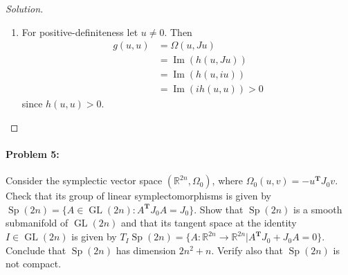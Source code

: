 \begin{proof}[Solution]
\begin{enumerate}
		\item For positive-definiteness let $u\neq 0$. Then
			\begin{align*}
				g(u,u)&=\Omega(u,Ju)\\
				&=\operatorname{Im}(h(u,Ju))\\
				&=\operatorname{Im}(h(u,iu))\\
				&=\operatorname{Im}(ih(u,u))>0
			\end{align*}
			since $h(u,u)>0$.
	\end{enumerate}

\end{proof}

 \paragraph{Problem 5:} Consider the symplectic vector space $(\mathbb{R}^{2n},\Omega_0)$, where $\Omega_0(u,v)=-u^{\mathbf{T}} J_0v$. Check that its group of linear symplectomorphisms is given by $\operatorname{Sp}(2n)=\{A\in \operatorname{GL}(2n):A^{\mathbf{T}}J_0A=J_0\}.$ Show that $\operatorname{Sp}(2n)$ is a smooth submanifold of $\operatorname{GL}(2n)$ and that its tangent space at the identity $I\in \operatorname{GL}(2n)$ is given by $T_{I}\operatorname{Sp}(2n)=\{A:\mathbb{R}^{2n}\to \mathbb{R}^{2n}|A^{\mathbf{T}} J_0+J_0A=0\} $. Conclude that $\operatorname{Sp}(2n)$ has dimension $2n^{2} +n$. Verify also that $\operatorname{Sp}(2n)$ is not compact.


